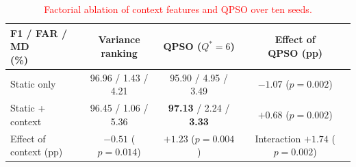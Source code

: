 \documentclass[conference]{IEEEtran}
\begin{document}
\begin{table}[!t]
\centering
\scriptsize
\caption{\textcolor{red}{Factorial ablation of context features and QPSO over ten seeds.}}
\label{tab:centralized_compare}
\color{red}
\setlength{\tabcolsep}{3pt}
\begin{tabular}{lccc}
\hline\toprule
\makecell[l]{F1 / FAR / MD\\(\%)} & \makecell{Variance\\ranking} & \makecell{QPSO\\($Q^{*}{=}6$)} & \makecell{Effect of\\QPSO (pp)} \\
\hline\toprule
Static only & 96.96 / 1.43 / 4.21 & 95.90 / 4.95 / 3.49 & \makecell{$-1.07$\\($p{=}0.002$)} \\
\makecell[l]{Static +\\context} & 96.45 / 1.06 / 5.36 & \textbf{97.13} / 2.24 / \textbf{3.33} & \makecell{$+0.68$\\($p{=}0.002$)} \\
\midrule
\makecell[l]{Effect of\\context (pp)} & \makecell{$-0.51$\\($p{=}0.014$)} & \makecell{$+1.23$\\($p{=}0.004$)} & \makecell{Interaction\\$+1.74$\\($p{=}0.002$)} \\
\hline\toprule
\end{tabular}
\end{table}
\end{document}
